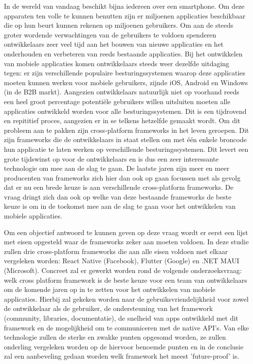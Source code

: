 In de wereld van vandaag beschikt bijna iedereen over een smartphone. Om deze apparaten ten volle te kunnen benutten zijn er miljoenen applicaties beschikbaar die op hun beurt kunnen rekenen op miljoenen gebruikers. Om aan de steeds groter wordende verwachtingen van de gebruikers te voldoen spenderen ontwikkelaars zeer veel tijd aan het bouwen van nieuwe applicaties en het onderhouden en verbeteren van reeds bestaande applicaties. Bij het ontwikkelen van mobiele applicaties komen ontwikkelaars steeds weer dezelfde uitdaging tegen: er zijn verschillende populaire besturingssystemen waarop deze applicaties moeten kunnen werken voor mobiele gebruikers, zijnde iOS, Android en Windows (in de B2B markt). Aangezien ontwikkelaars natuurlijk niet op voorhand reeds een heel groot percentage potentiële gebruikers willen uitsluiten moeten alle applicaties ontwikkeld worden voor alle besturingssystemen. Dit is een tijdrovend en repititief proces, aangezien er in se telkens hetzelfde gemaakt wordt. Om dit probleem aan te pakken zijn cross-platform frameworks in het leven geroepen. Dit zijn frameworks die de ontwikkelaars in staat stellen om met één enkele broncode hun applicatie te laten werken op verschillende besturingssystemen. Dit levert een grote tijdswinst op voor de ontwikkelaars en is dus een zeer interessante technologie om mee aan de slag te gaan. De laatste jaren zijn meer en meer producenten van frameworks zich hier dan ook op gaan focussen met als gevolg dat er nu een brede keuze is aan verschillende cross-platform frameworks. De vraag dringt zich dan ook op welke van deze bestaande frameworks de beste keuze is om in de toekomst mee aan de slag te gaan voor het ontwikkelen van mobiele applicaties.

Om een objectief antwoord te kunnen geven op deze vraag wordt er eerst een lijst met eisen opgesteld waar de frameworks zeker aan moeten voldoen. In deze studie zullen drie cross-platform frameworks die aan alle eisen voldoen met elkaar vergeleken worden: React Native (Facebook), Flutter (Google) en .NET MAUI (Microsoft). Concreet zal er gewerkt worden rond de volgende onderzoeksvraag: welk cross platform framework is de beste keuze voor een team van ontwikkelaars om de komende jaren op in te zetten voor het ontwikkelen van mobiele applicaties. Hierbij zal gekeken worden naar de gebruiksvriendelijkheid voor zowel de ontwikkelaar als de gebruiker, de ondersteuning van het framework (community, libraries, documentatie), de snelheid van apps ontwikkeld met dit framework en de mogelijkheid om te communiceren met de native API's. Van elke technologie zullen de sterke en zwakke punten opgesomd worden, ze zullen onderling vergeleken worden op de hiervoor benoemde punten en in de conclusie zal een aanbeveling gedaan worden welk framework het meest 'future-proof' is. 


%